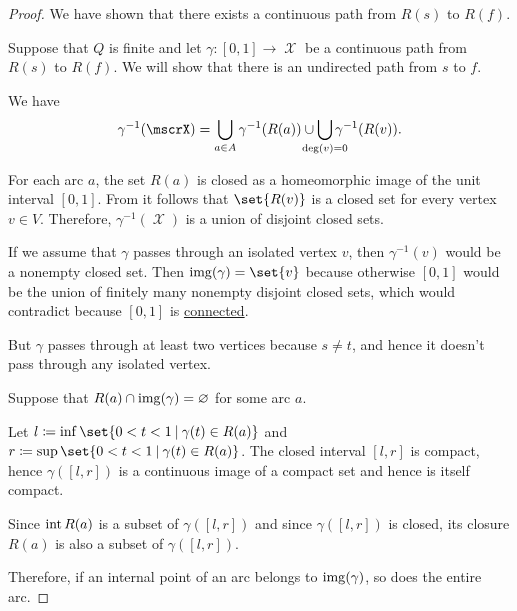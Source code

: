 \begin{proof}
  We have shown that there exists a continuous path from \( R(s) \) to \( R(f)  \).

   Suppose that \( Q \) is finite and let \( \gamma: [0, 1] \to \mscrX \) be a continuous path from \( R(s) \) to \( R(f) \). We will show that there is an undirected path from \( s \) to \( f \).

   We have
  \begin{equation}\label{eq:thm:quiver_geometric_realization_paths/full_preimage}
    \gamma^{-1}(\mscrX) = \bigcup_{a \in A} \gamma^{-1}(R(a)) \cup \bigcup_{\mathclap{\deg(v) = 0}} \gamma^{-1}(R(v)).
  \end{equation}

  For each arc \( a \), the set \( R(a) \) is closed as a homeomorphic image of the unit interval \( [0, 1] \). From  it follows that \( \set{ R(v) } \) is a closed set for every vertex \( v \in V \). Therefore, \( \gamma^{-1}(\mscrX) \) is a union of disjoint closed sets.

  If we assume that \( \gamma \) passes through an isolated vertex \( v \), then \( \gamma^{-1}(v) \) would be a nonempty closed set. Then \( \img(\gamma) = \set{ v } \) because otherwise \( [0, 1] \) would be the union of finitely many nonempty disjoint closed sets, which would contradict  because \( [0, 1] \) is \hyperref[def:connected_space]{connected}.

  But \( \gamma \) passes through at least two vertices because \( s \neq t \), and hence it doesn't pass through any isolated vertex.

   Suppose that \( R(a) \cap \operatorname{img}(\gamma) = \varnothing \) for some arc \( a \).

  Let \( l \coloneqq \inf\set{ 0 < t < 1 \given \gamma(t) \in R(a) } \) and \( r \coloneqq \sup\set{ 0 < t < 1 \given \gamma(t) \in R(a) } \). The closed interval \( [l, r] \) is compact, hence \( \gamma([l, r]) \) is a continuous image of a compact set and hence is itself compact.

  Since \( \operatorname{int} R(a) \) is a subset of \( \gamma([l, r]) \) and since \( \gamma([l, r]) \) is closed, its closure \( R(a) \) is also a subset of \( \gamma([l, r]) \).

  Therefore, if an internal point of an arc belongs to \( \operatorname{img}(\gamma) \), so does the entire arc.


\end{proof}
